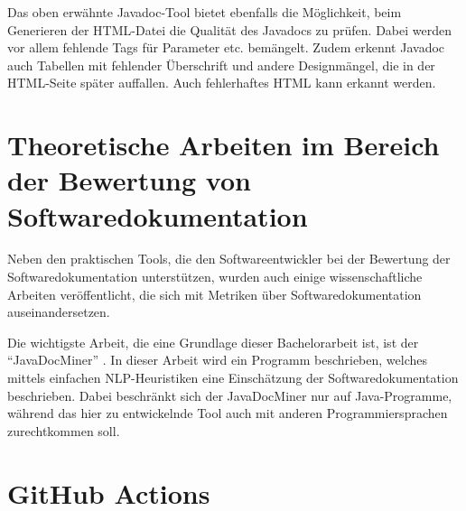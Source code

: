 Das oben erwähnte Javadoc-Tool bietet ebenfalls die Möglichkeit, beim Generieren der HTML-Datei die Qualität des Javadocs zu prüfen. Dabei werden vor allem fehlende Tags für Parameter etc. bemängelt. Zudem erkennt Javadoc auch Tabellen mit fehlender Überschrift und andere Designmängel, die in der HTML-Seite später auffallen. Auch fehlerhaftes HTML kann erkannt werden.

\section{Theoretische Arbeiten im Bereich der Bewertung von Softwaredokumentation}

Neben den praktischen Tools, die den Softwareentwickler bei der Bewertung der Softwaredokumentation unterstützen, wurden auch einige wissenschaftliche Arbeiten veröffentlicht, die sich mit Metriken über Softwaredokumentation auseinandersetzen. 

Die wichtigste Arbeit, die eine Grundlage dieser Bachelorarbeit ist, ist der \enquote{JavaDocMiner} \cite[S. 68-79]{AutomaticQualityAssessmentofSourceCodeComments:TheJavadocMiner}. In dieser Arbeit wird ein Programm beschrieben, welches mittels einfachen \ac{NLP}-Heuristiken eine Einschätzung der Softwaredokumentation beschrieben. Dabei beschränkt sich der JavaDocMiner nur auf Java-Programme, während das hier zu entwickelnde Tool  auch mit anderen Programmiersprachen zurechtkommen soll. 
\section{GitHub Actions}
